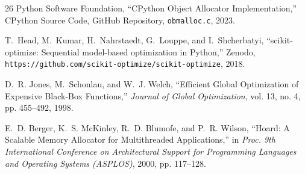 \begin{thebibliography}{26}
Python Software Foundation, ``CPython Object Allocator Implementation,'' CPython Source Code, GitHub Repository, \texttt{obmalloc.c}, 2023.

T.~Head, M.~Kumar, H.~Nahrstaedt, G.~Louppe, and I.~Shcherbatyi, ``scikit-optimize: Sequential model-based optimization in Python,'' Zenodo, \texttt{https://github.com/scikit-optimize/scikit-optimize}, 2018.

D.~R. Jones, M.~Schonlau, and W.~J. Welch, ``Efficient Global Optimization of Expensive Black-Box Functions,'' \emph{Journal of Global Optimization}, vol. 13, no. 4, pp. 455--492, 1998.

E.~D. Berger, K.~S. McKinley, R.~D. Blumofe, and P.~R. Wilson, ``Hoard: A Scalable Memory Allocator for Multithreaded Applications,'' in \emph{Proc. 9th International Conference on Architectural Support for Programming Languages and Operating Systems (ASPLOS)}, 2000, pp. 117--128.

\end{thebibliography}
